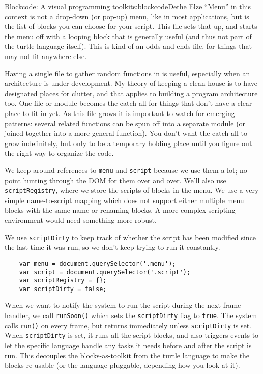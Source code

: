 \begin{aosachapter}{Blockcode: A visual programming toolkit}{s:blockcode}{Dethe Elze}
``Menu'' in this context is not a drop-down (or pop-up) menu, like in
most applications, but is the list of blocks you can choose for your
script. This file sets that up, and starts the menu off with a looping
block that is generally useful (and thus not part of the turtle language
itself). This is kind of an odds-and-ends file, for things that may not
fit anywhere else.

Having a single file to gather random functions in is useful, especially
when an architecture is under development. My theory of keeping a clean
house is to have designated places for clutter, and that applies to
building a program architecture too. One file or module becomes the
catch-all for things that don't have a clear place to fit in yet. As
this file grows it is important to watch for emerging patterns: several
related functions can be spun off into a separate module (or joined
together into a more general function). You don't want the catch-all to
grow indefinitely, but only to be a temporary holding place until you
figure out the right way to organize the code.

We keep around references to \texttt{menu} and \texttt{script} because
we use them a lot; no point hunting through the DOM for them over and
over. We'll also use \texttt{scriptRegistry}, where we store the scripts
of blocks in the menu. We use a very simple name-to-script mapping which
does not support either multiple menu blocks with the same name or
renaming blocks. A more complex scripting environment would need
something more robust.

We use \texttt{scriptDirty} to keep track of whether the script has been
modified since the last time it was run, so we don't keep trying to run
it constantly.

\begin{verbatim}
    var menu = document.querySelector('.menu');
    var script = document.querySelector('.script');
    var scriptRegistry = {};
    var scriptDirty = false;
\end{verbatim}

When we want to notify the system to run the script during the next
frame handler, we call \texttt{runSoon()} which sets the
\texttt{scriptDirty} flag to \texttt{true}. The system calls
\texttt{run()} on every frame, but returns immediately unless
\texttt{scriptDirty} is set. When \texttt{scriptDirty} is set, it runs
all the script blocks, and also triggers events to let the specific
language handle any tasks it needs before and after the script is run.
This decouples the blocks-as-toolkit from the turtle language to make
the blocks re-usable (or the language pluggable, depending how you look
at it).


\end{aosachapter}
